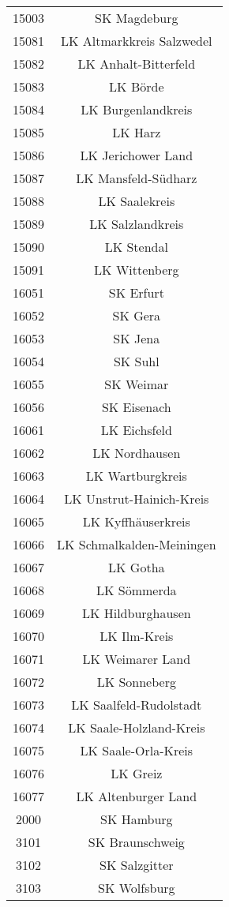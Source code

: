 \begin{tabular}{c c}
    15003&SK Magdeburg\\ 
    15081&LK Altmarkkreis Salzwedel\\ 
    15082&LK Anhalt-Bitterfeld\\ 
    15083&LK Börde\\ 
    15084&LK Burgenlandkreis\\ 
    15085&LK Harz\\ 
    15086&LK Jerichower Land\\ 
    15087&LK Mansfeld-Südharz\\ 
    15088&LK Saalekreis\\ 
    15089&LK Salzlandkreis\\ 
    15090&LK Stendal\\ 
    15091&LK Wittenberg\\ 
    16051&SK Erfurt\\ 
    16052&SK Gera\\ 
    16053&SK Jena\\ 
    16054&SK Suhl\\ 
    16055&SK Weimar\\ 
    16056&SK Eisenach\\ 
    16061&LK Eichsfeld\\ 
    16062&LK Nordhausen\\ 
    16063&LK Wartburgkreis\\ 
    16064&LK Unstrut-Hainich-Kreis\\ 
    16065&LK Kyffhäuserkreis\\ 
    16066&LK Schmalkalden-Meiningen\\ 
    16067&LK Gotha\\ 
    16068&LK Sömmerda\\ 
    16069&LK Hildburghausen\\ 
    16070&LK Ilm-Kreis\\ 
    16071&LK Weimarer Land\\ 
    16072&LK Sonneberg\\ 
    16073&LK Saalfeld-Rudolstadt\\ 
    16074&LK Saale-Holzland-Kreis\\ 
    16075&LK Saale-Orla-Kreis\\ 
    16076&LK Greiz\\ 
    16077&LK Altenburger Land\\ 
    2000&SK Hamburg\\ 
    3101&SK Braunschweig\\ 
    3102&SK Salzgitter\\ 
    3103&SK Wolfsburg\\ 

\end{tabular}
